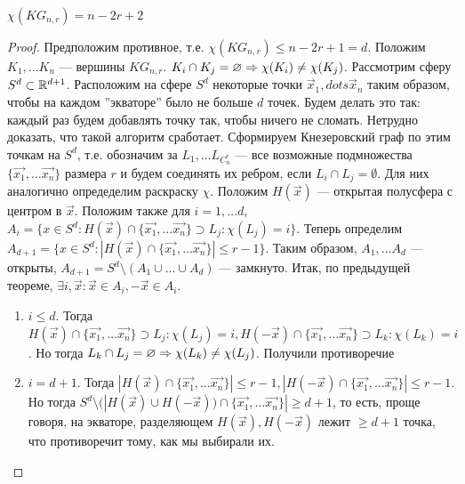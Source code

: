 \begin{proposition}
    \(\chi(KG_{n, r}) = n - 2r + 2\)
\end{proposition}
\begin{proof}
    Предположим противное, т.е. \(\chi(KG_{n, r}) \le n - 2r + 1 = d\). Положим \(K_1, \dots K_n\) --- вершины \(KG_{n, r}\). \(K_i \cap K_j = \varnothing \Rightarrow \chi(K_i) \ne \chi(K_j)\). Рассмотрим сферу \(S^d \subset \mathbb{R}^{d + 1}\). Расположим на сфере \(S^d\) некоторые точки \(\vec{x}_1, dots \vec{x}_n\) таким образом, чтобы на каждом ''экваторе'' было не больше \(d\) точек. Будем делать это так: каждый раз будем добавлять точку так, чтобы ничего не сломать. Нетрудно доказать, что такой алгоритм сработает. Сформируем Кнезеровский граф по этим точкам на \(S^d\), т.е. обозначим за \(L_1, \dots L_{C_n^r}\) --- все возможные подмножества \(\{\vec{x_1}, \dots \vec{x_n}\}\) размера \(r\) и будем соединять их ребром, если \(L_i \cap L_j = \emptyset\). Для них аналогично опредеделим раскраску \(\chi\). Положим \(H(\vec{x})\) --- открытая полусфера с центром в \(\vec{x}\). Положим также для \(i = 1, \dots d\), \(A_i = \{x \in S^d: H(\vec{x}) \cap \{\vec{x_1}, \dots \vec{x_n}\} \supset L_j: \chi(L_j) = i\}\). Теперь определим \(A_{d + 1} = \{x \in S^d: |H(\vec{x}) \cap \{\vec{x_1}, \dots \vec{x_n}\}| \le r - 1\}\). Таким образом, \(A_1, \dots A_d\) --- открыты, \(A_{d + 1} = S^d \setminus (A_1 \cup \dots \cup A_d)\) --- замкнуто. Итак, по предыдущей теореме, \(\exists i, \vec{x}: \vec{x} \in A_i, -\vec{x} \in A_i\). 
    \begin{enumerate}
        \item \(i \le d\). Тогда \(H(\vec{x}) \cap \{\vec{x_1}, \dots \vec{x_n}\} \supset L_j: \chi(L_j) = i, H(-\vec{x}) \cap \{\vec{x_1}, \dots \vec{x_n}\} \supset L_k: \chi(L_k) = i\). Но тогда \(L_k \cap L_j = \varnothing \Rightarrow \chi(L_k) \ne \chi(L_j)\). Получили противоречие
        \item \(i = d + 1\). Тогда \(|H(\vec{x}) \cap \{\vec{x_1}, \dots \vec{x_n}\}| \le r - 1, |H(-\vec{x}) \cap \{\vec{x_1}, \dots \vec{x_n}\}| \le r - 1\). Но тогда \(S^d \setminus (|H(\vec{x}) \cup H(-\vec{x})) \cap \{\vec{x_1}, \dots \vec{x_n}\}| \ge d + 1\), то есть, проще говоря, на экваторе, разделяющем \(H(\vec{x}), H(-\vec{x})\) лежит \(\ge d + 1\) точка, что противоречит тому, как мы выбирали их.
    \end{enumerate}
\end{proof}
